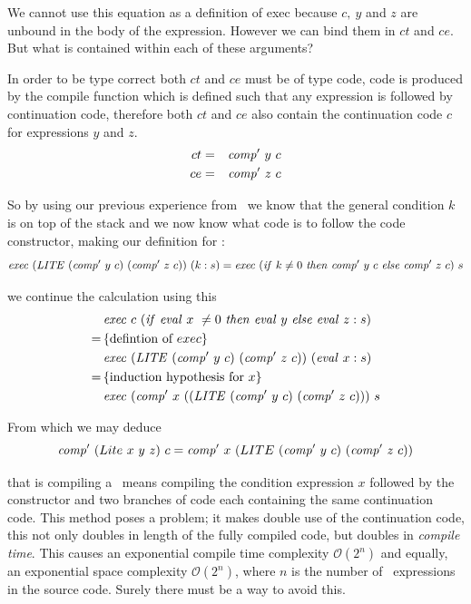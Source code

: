 \documentclass {article}
\begin{document}
We cannot use this equation as a definition of exec 
because $c,\ y$ and $z$ are unbound in the 
body of the expression\cite[page 10]{bandh}.
However we can bind them in $ct$ and $ce$.
But what is contained within each of these
arguments?

In order to be type correct both $ct$ and $ce$
must be of type code, code is produced by the 
compile function which is defined 
such that any expression is followed by
continuation code,
therefore both $ct$ and $ce$ also contain 
the continuation code $c$ for expressions
 $y$ and $z$.
\begin{eqnarray*}
	ct &=& \mathit{comp'\ }  y\ c \\
	ce &=& \mathit{comp'\ }  z\ c
\end{eqnarray*}

So by using our previous experience from \ite\ we
know that the general condition $k$ is on top of the stack
and we now know what code is to follow the code constructor,
making our definition for \exec: 
\begin{equation*}
	\Exec (\LITE (\Compp  y\ c)\ (\Compp  z\ c) )\ (k:s) 
= \Exec (\ifff k \not= 0\ \tthen \Compp  y\ c\ \eelse \Compp  z\ c)\ s 
\end{equation*}

\noindent we continue the calculation using this
\begin{align*}
	&\mathit{exec\ } c\ (\mathit{if\ } \mathit{eval\ }  x\ \not= 0\ \mathit{then\ } \mathit{eval\ }  y\ \mathit{else\ } \mathit{eval\ }  z : s) \\
	=\, & \{\mbox{defintion of}\ exec\} \\
	&\mathit{exec\ } (\mathit{LITE\ } (\mathit{comp'\ }  y\ c)\ (\mathit{comp'\ }  z\ c) )\ (\mathit{eval\ }  x : s) \\
	=\, & \{\mbox{induction hypothesis for}\ x\} \\
	&\mathit{exec\ } (\mathit{comp'\ }  x\ ((\mathit{LITE\ } (\mathit{comp'\ }  y\ c)\ (\mathit{comp'\ }  z\ c)))\ s
\end{align*}

From which we may deduce 
\[ \Compp  (Lite\ x\ y\ z)\ c 
		= \Compp  x\ (LITE\ (\Compp  y\ c)\ (\Compp  z\ c)) \]
		
\noindent that is compiling a \lite\ 
means compiling the condition expression $x$
followed by the \LITEt constructor and two
branches of code each containing the same
continuation code.
This method poses a problem;
it makes double use of the continuation code,
this not only doubles in length of the fully compiled code,
but doubles in \emph{compile time}.
This causes an exponential
 compile time complexity 
\( \mathcal{O}(2^n) \)
and equally, an exponential space complexity
\( \mathcal{O}(2^n) \),
where $n$ is the number of \lite\ expressions 
in the source code.
Surely there must be a way to avoid this.
\end{document}
